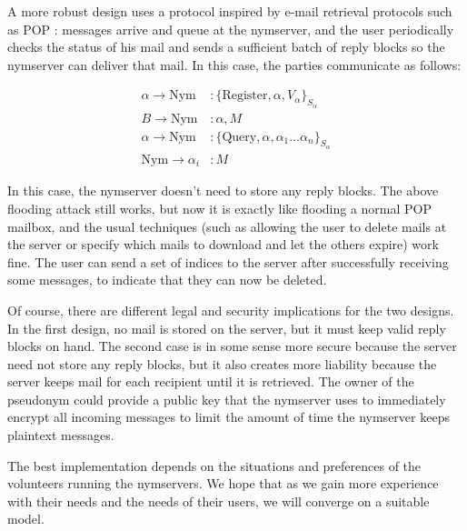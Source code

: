 \documentclass[times,10pt,twocolumn]{article}
\begin{document}
A more robust design uses a protocol inspired by e-mail retrieval
protocols such as POP \cite{POP3}:
messages arrive and queue at the nymserver, and the user periodically
checks the status of his mail and sends a sufficient batch of reply
blocks so the nymserver can deliver that mail.  In this case, the parties
communicate as follows:

\begin{equation}
\begin{aligned}
\alpha \rightarrow \mathrm{Nym}&: \{\mathrm{Register} , \alpha, V_{\alpha}\}_{S_{\alpha}}\\
B \rightarrow \mathrm{Nym}&: \alpha, M \\
\alpha \rightarrow \mathrm{Nym}&: \{\mathrm{Query} ,\alpha, \alpha_1 \dots
\alpha_n\}_{S_{\alpha}} \\
\mathrm{Nym} \rightarrow \alpha_i&: M
\end{aligned}
\end{equation}

In this case, the nymserver doesn't need to store any reply blocks.
The above flooding attack still works, but now it is exactly
like flooding a normal POP mailbox, and the usual techniques (such as
allowing the user to delete mails at the server or specify which mails to
download and let the others expire) work fine. The user can send a set
of indices to the server after successfully receiving
some messages, to indicate that they can now be deleted.

Of course, there are different legal and security implications for the two
designs. In the first design, no mail is stored on the server, but it must
keep valid reply blocks on hand. The second case is in some sense more
secure because the server need not store any reply blocks, but it also
creates more liability because the server keeps mail for each recipient
until it is retrieved. The owner of the pseudonym could provide a public
key that the nymserver uses to immediately encrypt all incoming messages
to limit the amount of time the nymserver keeps plaintext messages.

The best implementation depends on the situations and preferences of the
volunteers running the nymservers.  We hope that as we gain more experience
with their needs and the needs of their users, we will converge on a suitable
model.

\end{document}
